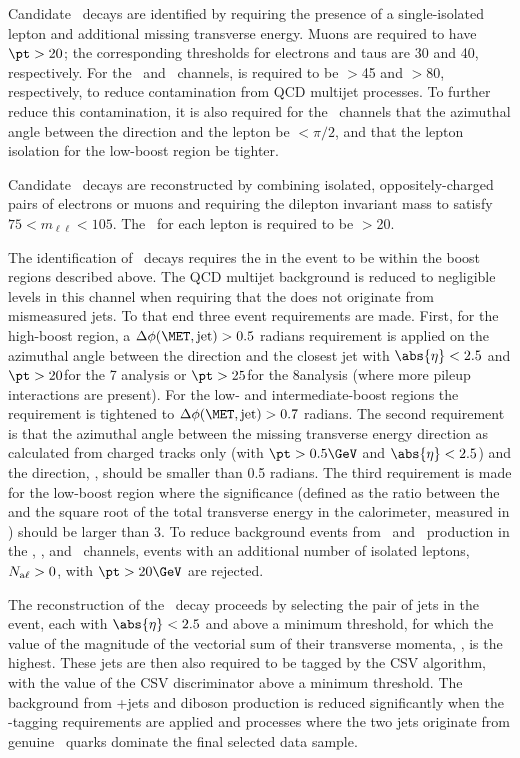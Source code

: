 \documentclass[11pt,twoside,a4paper,cmspaper,final,collab]{cms-tdr}
\begin{document}
Candidate \WtoLN\ decays are identified by requiring
the presence of a single-isolated lepton and additional missing
transverse energy. Muons are required to have $\pt>20$\GeV; the corresponding thresholds for electrons and taus are 30 and
40\GeV, respectively. For the \WlnH\ and \WtnH\ channels, \MET is
required to be $>$45 and $>$80\GeV, respectively,
to reduce contamination from QCD multijet processes. To further reduce
this contamination, it is also required for the \WlnH\
channels that the azimuthal angle between the \MET direction and the lepton be
${<}\pi/2$, and that the lepton isolation for the low-boost
region be tighter.


Candidate \ZtoLL\ decays are reconstructed by combining
isolated, oppositely-charged pairs of electrons or muons and requiring the dilepton invariant
mass to satisfy $75<m_{\ell\ell}<105$\GeV.  The
\pt\ for each lepton is required to be $>$20\GeV.

The identification of \ZtoNN\ decays
requires the \MET in the event to be within the boost regions
described above. The QCD multijet
background is reduced to negligible levels in this channel when requiring that the \MET does not originate from
mismeasured jets. To that end three event requirements are made. First,
for the high-boost region, a $\dphiMJ>0.5$ radians requirement is applied on the azimuthal angle
between the \MET direction and
the closest jet with $\abs{\eta}<2.5$ and $\pt>20$\GeV for the 7\TeV
analysis or $\pt>25$\GeV for the 8\TeV analysis (where more pileup
interactions are
present). For the low- and intermediate-boost regions the requirement is
tightened to $\dphiMJ>0.7$ radians. The second requirement is that the
azimuthal angle between the missing transverse energy direction as
calculated from charged tracks only (with $\pt>0.5\GeV$ and $\abs{\eta}<2.5$) and the \MET direction, \dphiMtrk, should be smaller
than 0.5 radians. The third requirement is made for the low-boost
region where the \MET significance (defined as the ratio between the \MET
and the square root of the total transverse energy in the
calorimeter, measured in \GeV) should be larger than 3.  To reduce background
events from \ttbar\ and \WZ\ production in the \WlnH, \WtnH, and \ZnnH\ channels,
events with an additional number of isolated leptons, $N_{\mathrm{a}\ell} >0$, with $\pt>20\GeV$ are
rejected.

The reconstruction of the \HBB\ decay proceeds by selecting the pair
of jets in the event, each with $\abs{\eta}<2.5$ and \pt above a minimum
threshold, for which the value of the magnitude of the vectorial sum
of their transverse momenta, \ptjj, is the highest.
These jets are then also required to
be tagged by the CSV algorithm, with the value of the CSV discriminator
above a minimum threshold. The background from {\Vvar}+jets and
diboson production is reduced significantly
when the \cPqb-tagging requirements are applied and processes where the two jets originate from
genuine \cPqb\ quarks dominate the final selected data sample.
\end{document}
